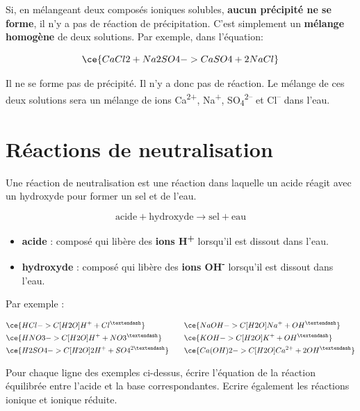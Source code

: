 \documentclass[
  11pt,
  a4paper,
  openany]{book}
\providecommand{\tightlist}{%
  \setlength{\itemsep}{0pt}\setlength{\parskip}{0pt}}
\begin{document}
Si, en mélangeant deux composés ioniques solubles, \textbf{aucun précipité ne se forme}, il n'y a pas de réaction de précipitation. C'est simplement un \textbf{mélange homogène} de deux solutions. Par exemple, dans l'équation:

\[ \ce{CaCl2 + Na2SO4 -> CaSO4 + 2NaCl} \]

Il ne se forme pas de précipité. Il n'y a donc pas de réaction. Le mélange de ces deux solutions sera un mélange de ions Ca\textsuperscript{2+}, Na\textsuperscript{+}, SO\textsubscript{4}\textsuperscript{2--} et Cl\textsuperscript{--} dans l'eau.

\section{Réactions de neutralisation}\label{ruxe9actions-de-neutralisation}

Une réaction de neutralisation est une réaction dans laquelle un acide réagit avec un hydroxyde pour former un sel et de l'eau.

\[ \text{acide} + \text{hydroxyde} \longrightarrow \text{sel} + \text{eau} \]

\begin{itemize}
\tightlist
\item
  \textbf{acide} : composé qui libère des \textbf{ions H\textsuperscript{+}} lorsqu'il est dissout dans l'eau.
\item
  \textbf{hydroxyde} : composé qui libère des \textbf{ions OH\textsuperscript{-}} lorsqu'il est dissout dans l'eau.
\end{itemize}

Par exemple :

\[ \begin{split}
  & \ce{HCl ->C[H2O] H^{+} + Cl^{–}} \\
  & \ce{HNO3 ->C[H2O] H^{+} + NO3^{–}} \\
  & \ce{H2SO4 ->C[H2O] 2H^{+} + SO4^{2–}}
  \end{split}
  \qquad
  \begin{split}
   & \ce{NaOH ->C[H2O] Na^{+} + OH^{–}} \\
   & \ce{KOH ->C[H2O] K^{+} + OH^{–}} \\
   & \ce{Ca(OH)2 ->C[H2O] Ca^{2+} + 2OH^{–}}
 \end{split} \]

\begin{Exercise}

Pour chaque ligne des exemples ci-dessus, écrire l'équation de la réaction équilibrée entre l'acide et la base correspondantes. Ecrire également les réactions ionique et ionique réduite.


\end{Exercise}
\end{document}

